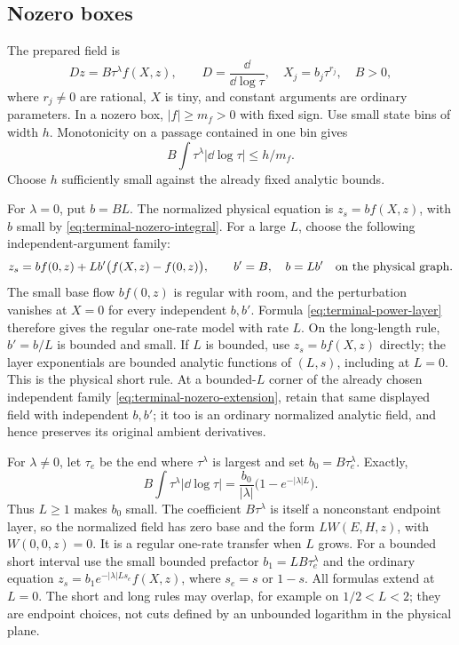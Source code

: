 \subsection{Nozero boxes}

The prepared field is
\begin{equation}\label{eq:terminal-box}
 D z=B\tau^\lambda f(X,z),\qquad
 D=\frac{\dd}{\dd\log\tau},\quad
 X_j=b_j\tau^{r_j},\quad B>0,
\end{equation}
where \(r_j\ne0\) are rational, \(X\) is tiny, and constant arguments are
ordinary parameters.  In a nozero box, \(|f|\ge m_f>0\) with fixed sign.
Use small state bins of width \(h\).  Monotonicity on a passage contained in
one bin gives
\begin{equation}\label{eq:terminal-nozero-integral}
 B\int \tau^\lambda|\dd\log\tau|\le h/m_f.
\end{equation}
Choose \(h\) sufficiently small against the already fixed analytic bounds.

For \(\lambda=0\), put \(b=BL\).  The normalized physical equation is
\(z_s=b f(X,z)\), with \(b\) small by
\eqref{eq:terminal-nozero-integral}.  For a large \(L\), choose the following
independent-argument family:
\begin{equation}\label{eq:terminal-nozero-extension}
 z_s=b f(0,z)+L b'\bigl(f(X,z)-f(0,z)\bigr),
 \qquad b'=B,\quad b=Lb'\quad\hbox{on the physical graph}.
\end{equation}
The small base flow \(b f(0,z)\) is regular with room, and the perturbation
vanishes at \(X=0\) for every independent \(b,b'\).  Formula
\eqref{eq:terminal-power-layer} therefore gives the regular one-rate model
with rate \(L\).  On the long-length rule, \(b'=b/L\) is bounded and small.
If \(L\) is bounded, use \(z_s=b f(X,z)\) directly; the layer exponentials
are bounded analytic functions of \((L,s)\), including at \(L=0\).
This is the physical short rule.  At a bounded-\(L\) corner of the
already chosen independent family \eqref{eq:terminal-nozero-extension},
retain that same displayed field with independent \(b,b'\); it too is
an ordinary normalized analytic field, and hence preserves its original
ambient derivatives.

For \(\lambda\ne0\), let \(\tau_e\) be the end where \(\tau^\lambda\)
is largest and set \(b_0=B\tau_e^\lambda\).  Exactly,
\begin{equation}\label{eq:terminal-nozero-power-integral}
 B\int\tau^\lambda|\dd\log\tau|
 =\frac{b_0}{|\lambda|}\bigl(1-e^{-|\lambda|L}\bigr).
\end{equation}
Thus \(L\ge1\) makes \(b_0\) small.  The coefficient
\(B\tau^\lambda\) is itself a nonconstant endpoint layer, so the normalized
field has zero base and the form \(L W(E,H,z)\), with
\(W(0,0,z)=0\).  It is a regular one-rate transfer when \(L\) grows.
For a bounded short interval use the small bounded prefactor
\(b_1=LB\tau_e^\lambda\) and the ordinary equation
\(z_s=b_1e^{-|\lambda|L s_e}f(X,z)\), where \(s_e=s\) or \(1-s\).
All formulas extend at \(L=0\).  The short and long rules may overlap,
for example on \(1/2<L<2\); they are endpoint choices, not cuts defined by
an unbounded logarithm in the physical plane.

